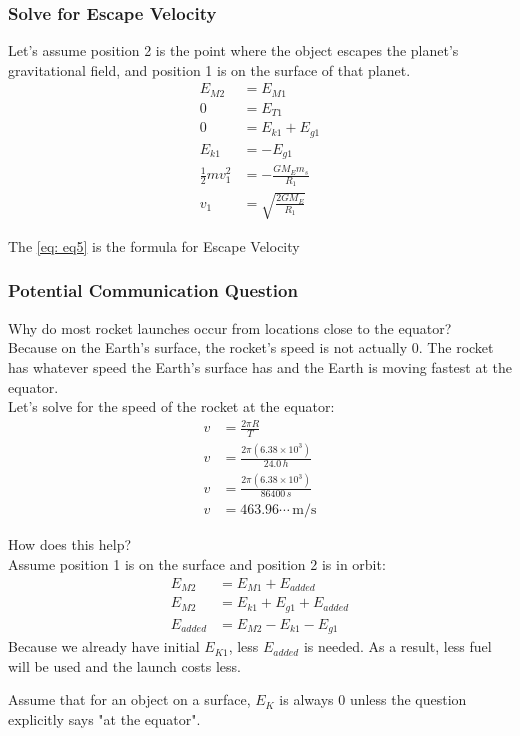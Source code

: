 \subsubsection{Solve for Escape Velocity}
Let's assume position 2 is the point where the object escapes the planet's gravitational field, and position 1 is on the surface of that planet.
\begin{align}
    E_{M2} &= E_{M1}\\
    0 &= E_{T1}\\
    0 &= E_{k1} + E_{g1}\\
    E_{k1} &= -E_{g1}\\
    \frac{1}{2}mv_1^2 &= -\frac{G M_E m_s}{R_1}\\
    v_1 &= \sqrt{\frac{2G M_E}{R_1}} \label{eq: eq5}
\end{align}

The \ref{eq: eq5} is the formula for Escape Velocity

\subsubsection{Potential Communication Question}
Why do most rocket launches occur from locations close to the equator?\\

\indent Because on the Earth's surface, the rocket's speed is not actually 0. The rocket has whatever speed the Earth's surface has and the Earth is moving fastest at the equator. \\

Let's solve for the speed of the rocket at the equator:
\begin{align*}
    v &= \frac{2\pi R}{T}\\
    v &= \frac{2\pi (6.38 \times 10^3)}{24.0\,h}\\
    v &= \frac{2\pi (6.38 \times 10^3)}{86400\,s}\\
    v &= 463.96\cdots\,\text{m/s}
\end{align*}

How does this help?\\
Assume position 1 is on the surface and position 2 is in orbit:
\begin{align*}
    E_{M2} &= E_{M1} + E_{added}\\
    E_{M2} &= E_{k1} + E_{g1} + E_{added}\\
    E_{added} &= E_{M2} - E_{k1} - E_{g1}
\end{align*}
Because we already have initial $E_{K1}$, less $E_{added}$ is needed. As a result, less fuel will be used and the launch costs less.

\begin{remark}
    Assume that for an object on a surface, $E_K$ is always 0 unless the question explicitly says "at the equator".
\end{remark}
